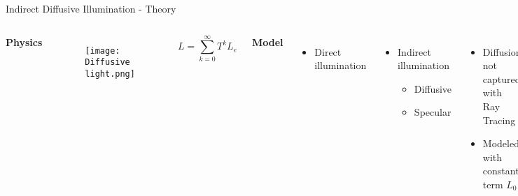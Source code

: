 
    \begin{frame}{Indirect Diffusive Illumination - Theory}
        \begin{columns}[T]
            \textbf{Physics}
            \begin{figure}
                \centering
                \texttt{[image: Diffusive light.png]}
            \end{figure}
            \pause
            \begin{equation*}
                L = \sum^\infty_{k=0}T^k L_e
            \end{equation*}
            
            \textbf{Model}

            \pause
            \begin{columns}[T]
                \begin{itemize}
                    \item Direct illumination
                \end{itemize}

                \begin{itemize}
                    \item Indirect illumination
                    \begin{itemize}
                        \pause
                        \item Diffusive
                        \item Specular
                    \end{itemize}
                \end{itemize}
            \end{columns}

            \pause
            \begin{itemize}
                \item Diffusion not captured with Ray Tracing
                \pause
                \item Modeled with constant term $L_0$
            \end{itemize}            


\end{columns}
\end{frame}
